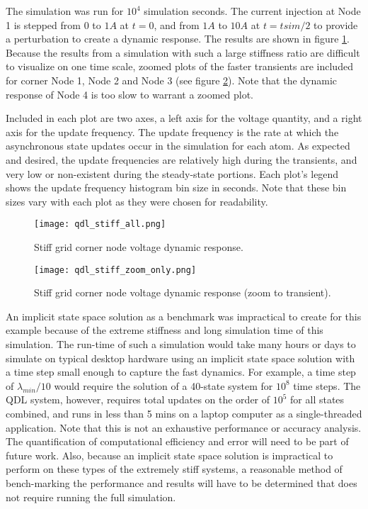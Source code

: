 The simulation was run for $10^4$ simulation seconds. The current injection at Node 1 is stepped from $0$ to $1 A$ at $t=0$, and from $1 A$ to $10 A$ at $t=tsim/2$ to provide a perturbation to create a dynamic response. The results are shown in figure \ref{fig:qdl_stiff_all}. Because the results from a simulation with such a large stiffness ratio are difficult to visualize on one time scale, zoomed plots of the faster transients are included for corner Node 1, Node 2 and Node 3 (see figure \ref{fig:qdl_stiff_zoom_only}). Note that the dynamic response of Node 4 is too slow to warrant a zoomed plot. 

Included in each plot are two axes, a left axis for the voltage quantity, and a right axis for the update frequency. The update frequency is the rate at which the asynchronous state updates occur in the simulation for each atom. As expected and desired, the update frequencies are relatively high during the transients, and very low or non-existent during the steady-state portions. Each plot's legend shows the update frequency histogram bin size in seconds. Note that these bin sizes vary with each plot as they were chosen for readability.  

\begin{figure}[htb]
    \centering
    \texttt{[image: qdl\_stiff\_all.png]}
    \caption{Stiff grid corner node voltage dynamic response.}
    \label{fig:qdl_stiff_all}
\end{figure}  

\begin{figure}[htb]
    \centering
    \texttt{[image: qdl\_stiff\_zoom\_only.png]}
    \caption{Stiff grid corner node voltage dynamic response (zoom to transient).}
    \label{fig:qdl_stiff_zoom_only}
\end{figure} 

An implicit state space solution as a benchmark was impractical to create for this example because of the extreme stiffness and long simulation time of this simulation. The run-time of such a simulation would take many hours or days to simulate on typical desktop hardware using an implicit state space solution with a time step small enough to capture the fast dynamics. For example, a time step of $\lambda_{min}/10$ would require the solution of a 40-state system for $10^8$ time steps. The QDL system, however, requires total updates on the order of $10^5$ for all states combined, and runs in less than 5 mins on a laptop computer as a single-threaded application. Note that this is not an exhaustive performance or accuracy analysis. The quantification of computational efficiency and error will need to be part of future work. Also, because an implicit state space solution is impractical to perform on these types of the extremely stiff systems, a reasonable method of bench-marking the performance and results will have to be determined that does not require running the full simulation.

